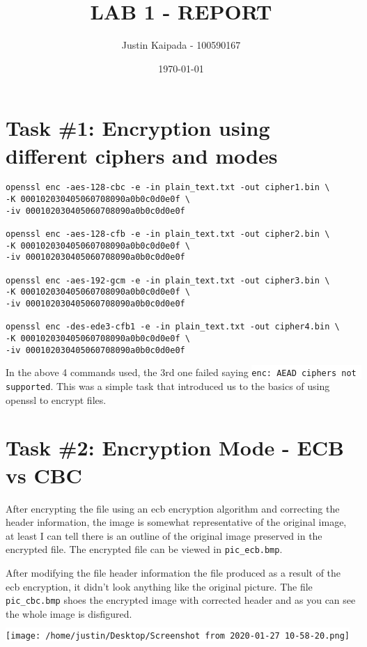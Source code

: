 \documentclass[11pt,letterpaper]{article}
\author{Justin Kaipada - 100590167}
\date{\today}
\title{LAB 1 - REPORT}
\let\OldTexttt\texttt
\renewcommand{\texttt}[1]{\OldTexttt{\footnotesize\colorbox{background}{\textcolor{foreground}{#1}}}}
\begin{document}
\maketitle
\newpage %

\section*{Task \#1: Encryption using different ciphers and modes}
\label{sec:orgd05415f}
\lstset{language=cpp,label= ,caption= ,captionpos=b,numbers=none}
\begin{lstlisting}
openssl enc -aes-128-cbc -e -in plain_text.txt -out cipher1.bin \
-K 000102030405060708090a0b0c0d0e0f \
-iv 000102030405060708090a0b0c0d0e0f

openssl enc -aes-128-cfb -e -in plain_text.txt -out cipher2.bin \
-K 000102030405060708090a0b0c0d0e0f \
-iv 000102030405060708090a0b0c0d0e0f

openssl enc -aes-192-gcm -e -in plain_text.txt -out cipher3.bin \
-K 000102030405060708090a0b0c0d0e0f \
-iv 000102030405060708090a0b0c0d0e0f

openssl enc -des-ede3-cfb1 -e -in plain_text.txt -out cipher4.bin \
-K 000102030405060708090a0b0c0d0e0f \
-iv 000102030405060708090a0b0c0d0e0f
\end{lstlisting}

In the above 4 commands used, the 3rd one failed saying \texttt{enc: AEAD ciphers not supported}. This was
a simple task that introduced us to the basics of using openssl to encrypt files.

\section*{Task \#2: Encryption Mode - ECB vs CBC}
\label{sec:org32699b5}

After encrypting the file using an ecb encryption algorithm and correcting the header information,
the image is somewhat representative of the original image, at least I can tell there is an outline
of the original image preserved in the encrypted file. The encrypted file can be viewed in
\texttt{pic\_ecb.bmp}.

After modifying the file header information the file produced as a result of the ecb encryption, it
didn't look anything like the original picture. The file \texttt{pic\_cbc.bmp} shoes the encrypted image
with corrected header and as you can see the whole image is disfigured.

\begin{center}
\texttt{[image: /home/justin/Desktop/Screenshot from 2020-01-27 10-58-20.png]}
\end{center}
\end{document}
